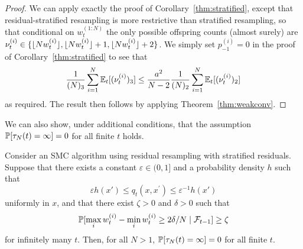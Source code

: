 \begin{proof}
We can apply exactly the proof of Corollary~\ref{thm:stratified}, except that residual-stratified resampling is more restrictive than stratified resampling, so that conditional on $w_t^{(1:N)}$ the only possible offspring counts (almost surely) are $\nu_t^{(i)} \in \{ \lfloor N w_t^{(i)} \rfloor, \lfloor N w_t^{(i)} \rfloor +1, \lfloor N w_t^{(i)} \rfloor +2 \}$. We simply set $p_{-1}^{(i)} = 0$ in the proof of Corollary~\ref{thm:stratified} to see that
\begin{equation*}
\frac{1}{(N)_3} \sum_{i=1}^{N} \mathbb{E}_t [(\nu_t^{(i)})_3 ]
\leq \frac{a^2}{N-2} \frac{1}{(N)_2} \sum_{i=1}^{N} \mathbb{E}_t [(\nu_t^{(i)})_2 ]
\end{equation*}
as required.
The result then follows by applying Theorem~\ref{thm:weakconv}.
\end{proof}
We can also show, under additional conditions, that the assumption $\mathbb{P}[ \tau_N(t) = \infty ] =0$ for all finite $t$ holds.

\begin{prop}\label{thm:resstrat_nontriviality}
Consider an SMC algorithm using residual resampling with stratified residuals.
Suppose that there exists a constant $\varepsilon \in (0,1]$ and a probability density $h$ such that
\begin{equation*}
\varepsilon h(x') \leq q_t(x, x^\prime) \leq \varepsilon^{-1} h(x')
\end{equation*}
uniformly in $x$, and that there exist $\zeta >0$ and $\delta >0$ such that 
\begin{equation*}
\mathbb{P}[ \max_i w_t^{(i)} - \min_i w_t^{(i)} \geq 2\delta/N \mid \mathcal{F}_{t-1} ] \geq \zeta
\end{equation*}
 for infinitely many $t$. Then, for all $N>1$, $\mathbb{P}[ \tau_N(t) = \infty ] =0$ for all finite $t$.
\end{prop}

